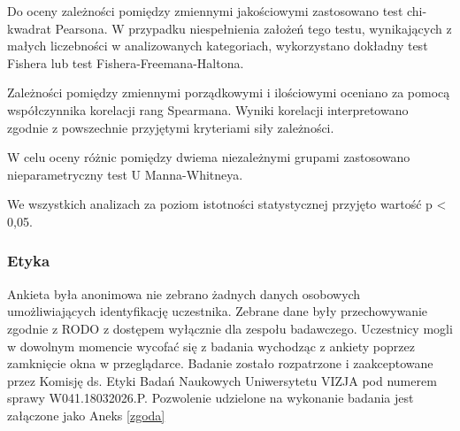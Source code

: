 Do oceny zależności pomiędzy zmiennymi jakościowymi zastosowano test chi-kwadrat Pearsona. W przypadku niespełnienia założeń tego testu, wynikających z małych liczebności w analizowanych kategoriach, wykorzystano dokładny test Fishera lub test Fishera-Freemana-Haltona.

Zależności pomiędzy zmiennymi porządkowymi i ilościowymi oceniano za pomocą współczynnika korelacji rang Spearmana. Wyniki korelacji interpretowano zgodnie z powszechnie przyjętymi kryteriami siły zależności.

W celu oceny różnic pomiędzy dwiema niezależnymi grupami zastosowano nieparametryczny test U Manna-Whitneya.

We wszystkich analizach za poziom istotności statystycznej przyjęto wartość p < 0,05.

\subsubsection{Etyka}

Ankieta była anonimowa nie zebrano żadnych danych osobowych umożliwiających identyfikację uczestnika. Zebrane dane były przechowywanie zgodnie z RODO z dostępem wyłącznie dla zespołu badawczego. Uczestnicy mogli w dowolnym momencie wycofać się z badania wychodząc z ankiety poprzez zamknięcie okna w przeglądarce. Badanie zostało rozpatrzone i zaakceptowane przez Komisję ds. Etyki Badań Naukowych Uniwersytetu VIZJA pod numerem sprawy W041.18032026.P. Pozwolenie udzielone na wykonanie badania jest załączone jako Aneks \ref{zgoda}

